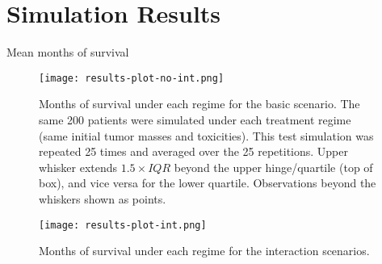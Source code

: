 \documentclass[12pt]{article}
\begin{document}


\section{Simulation Results} %
\label{sec:simulation_results}

Mean months of survival 

\begin{figure}[!tbp]
\begin{center}
\texttt{[image: results-plot-no-int.png]}
\end{center}
\caption[Months of survival under scenarios without interaction]{Months of survival under each regime for the basic scenario. The same 200 patients were simulated under each treatment regime (same initial tumor masses and toxicities). This test simulation was  repeated 25 times and averaged over the 25 repetitions. 
Upper whisker extends $1.5 \times IQR$ beyond the upper hinge/quartile (top of box), and vice versa for the lower quartile. Observations beyond the whiskers shown as points.}
\label{fig:results-no-int}
\end{figure}

\begin{figure}[!tbp]
\begin{center}
\texttt{[image: results-plot-int.png]}
\end{center}
\caption[Months of survival under scenarios with interaction]{Months of survival under each regime for the interaction scenarios.}
\label{fig:results-int}
\end{figure}
\end{document}

